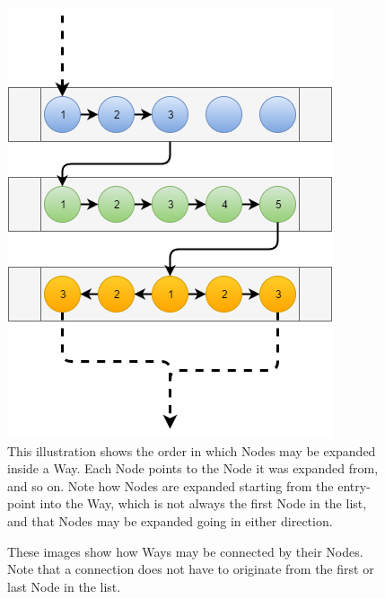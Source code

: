 \begin{figure}
	\centering
	\caption[Order of Node-expansion]{This illustration shows the order in which Nodes may be expanded inside a Way. Each Node points to the Node it was expanded from, and so on. Note how Nodes are expanded starting from the entry-point into the Way, which is not always the first Node in the list, and that Nodes may be expanded going in either direction.}
	\label{fig:nodeExpansion}
	\includegraphics[keepaspectratio, width=0.49\columnwidth]{Images/Way_expansion-order}
\end{figure}

\begin{figure}
	\centering

	\caption[Connections between Ways]{These images show how Ways may be connected by their Nodes. Note that a connection does not have to originate from the first or last Node in the list.}
	\label{fig:connectionsWays}
\end{figure}

